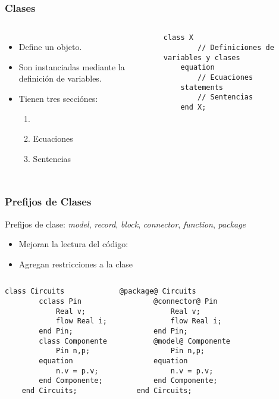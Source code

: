 \documentclass[aspectratio=169,10pt]{beamer}
\begin{document}
\begin{frame}[fragile]
\frametitle{Clases} 
\begin{columns}  
\begin{itemize}
    \item Define un objeto.
    \item Son instanciadas mediante la definici\'on de variables.
    \item Tienen tres secci\'ones:
        \begin{enumerate}
            \item {}
            \item Ecuaciones
            \item Sentencias
        \end{enumerate}
\end{itemize}

\begin{lstlisting}[style=base]
    class X
        // Definiciones de variables y clases   
    equation
        // Ecuaciones
    statements
        // Sentencias
    end X;   
\end{lstlisting}
\end{columns}
\end{frame}

\begin{frame}[fragile]
\frametitle{Prefijos de Clases} 
Prefijos de clase: \textit{model}, \textit{record}, \textit{block}, \textit{connector}, \textit{function}, \textit{package}
\begin{itemize}
    \item Mejoran la lectura del c\'odigo:
    \item Agregan restricciones a la clase
\end{itemize}   

\begin{columns}  
\begin{lstlisting}[style=base]
    class Circuits
        cclass Pin
            Real v;
            flow Real i;
        end Pin;
        class Componente
            Pin n,p;
        equation 
            n.v = p.v;
        end Componente; 
    end Circuits;   
\end{lstlisting}
\par

\begin{lstlisting}[style=base]
    @package@ Circuits
        @connector@ Pin
            Real v;
            flow Real i;
        end Pin;
        @model@ Componente
            Pin n,p;
        equation 
            n.v = p.v;
        end Componente; 
    end Circuits;   
\end{lstlisting}
\par
\end{columns}
\end{frame}
\end{document}
